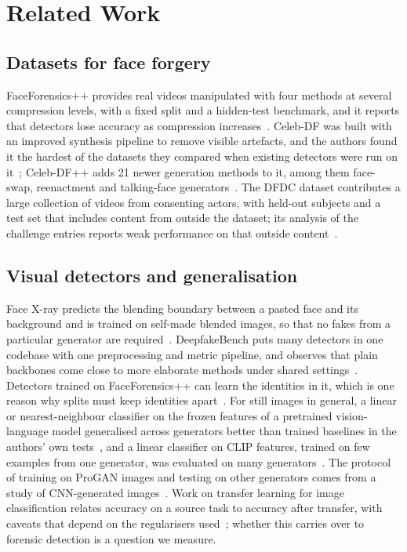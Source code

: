 \documentclass[conference,a4paper]{IEEEtran_nodash}
\begin{document}
\section{Related Work}\label{sec:related}

\subsection{Datasets for face forgery}
FaceForensics++ provides real videos manipulated with four methods at several
compression levels, with a fixed split and a hidden-test benchmark, and it
reports that detectors lose accuracy as compression
increases~\cite{rossler2019faceforensics}. Celeb-DF was built with an improved
synthesis pipeline to remove visible artefacts, and the authors found it the
hardest of the datasets they compared when existing detectors were run on
it~\cite{li2020celebdf}; Celeb-DF++ adds 21 newer generation methods to it, among them face-swap,
reenactment and talking-face generators~\cite{li2025celebdfpp}. The DFDC dataset contributes a large
collection of videos from consenting actors, with held-out subjects and a test
set that includes content from outside the dataset; its analysis of the
challenge entries reports weak performance on that outside
content~\cite{dolhansky2020dfdc}.

\subsection{Visual detectors and generalisation}
Face X-ray predicts the blending boundary between a pasted face and its
background and is trained on self-made blended images, so that no fakes from a
particular generator are required~\cite{li2020facexray}. DeepfakeBench puts
many detectors in one codebase with one preprocessing and metric pipeline, and
observes that plain backbones come close to more elaborate methods under shared
settings~\cite{yan2023deepfakebench}. Detectors trained on FaceForensics++ can
learn the identities in it, which is one reason why splits must keep identities
apart~\cite{dong2023implicit}. For still images in general, a linear or
nearest-neighbour classifier on the frozen features of a pretrained
vision-language model generalised across generators better than trained
baselines in the authors' own tests~\cite{ojha2024universal}, and a linear
classifier on CLIP features, trained on few examples from one generator, was
evaluated on many generators~\cite{cozzolino2024raising}. The protocol of
training on ProGAN images and testing on other generators comes
from a study of CNN-generated images~\cite{wang2020cnnspot}. Work on transfer learning for image
classification relates accuracy on a source task to accuracy after transfer,
with caveats that depend on the regularisers used~\cite{kornblith2019better};
whether this carries over to forensic detection is a question we measure.
\end{document}
